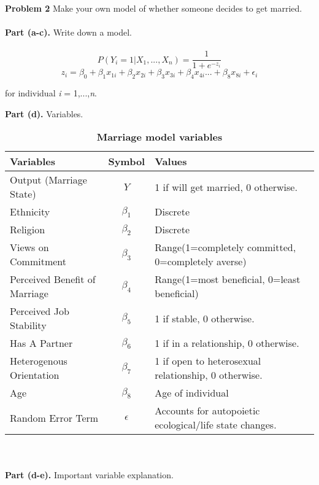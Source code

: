 \documentclass[letterpaper,12pt]{article}
\theoremstyle{definition}
\begin{document}
{

\vspace{5mm}

\noindent\textbf{Problem 2} Make your own model of whether someone decides to get married.
\\
\\
\noindent\textbf{Part (a-c).} Write down a model.
\\
\\
\begin{equation}\label{marriage}
  P\left(Y_{i} = 1 | X_{1},...,X_{n}\right) = \frac{1}{1 + e^{-z_{i}}}
\end{equation}
\begin{equation}
  z_{i} = \beta_0 + \beta_1 x_{1i} + \beta_2 x_{2i} + \beta_3 x_{3i} + \beta_4 x_{4i} ... + \beta_8 x_{8i} + \epsilon_{i}
\end{equation}
\begin{center}for individual \emph{i} = 1,...,\emph{n}. \end{center}

\noindent\textbf{Part (d).} Variables.
\begin{table}[htbp] \centering \captionsetup{width=6.0in}
\caption{\label{Tab}\textbf{Marriage model variables}}
  \begin{threeparttable}
  \begin{tabular}{>{\footnotesize}l |>{\footnotesize}c |>{\footnotesize}l}
    \hline\hline
    Variables & Symbol & Values \\
    \hline
    Output (Marriage State) & $Y$ & 1 if will get married, 0 otherwise. \\
    Ethnicity & $\beta_1$ & Discrete \\
    Religion & $\beta_2$ & Discrete  \\
    Views on Commitment & $\beta_3$ & Range(1=completely committed, 0=completely averse) \\
    Perceived Benefit of Marriage & $\beta_4$ & Range(1=most beneficial, 0=least beneficial) \\
    Perceived Job Stability & $\beta_5$ & 1 if stable, 0 otherwise. \\
    Has A Partner & $\beta_6$ & 1 if in a relationship, 0 otherwise. \\
    Heterogenous Orientation & $\beta_7$ & 1 if open to heterosexual relationship, 0 otherwise. \\
    Age & $\beta_8$ & Age of individual \\
    Random Error Term & $\epsilon$ & Accounts for autopoietic ecological/life state changes. \\
    \hline\hline
  \end{tabular}
  \end{threeparttable}
\end{table}
\\
\\
\noindent\textbf{Part (d-e).} Important variable explanation.

}
\end{document}
